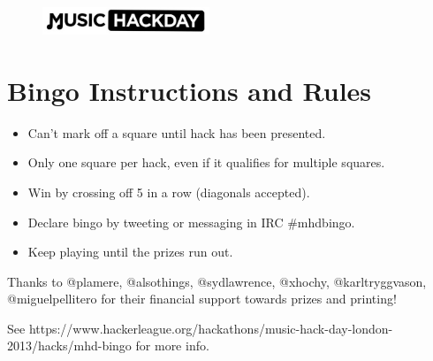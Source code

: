 \documentclass[a4]{article}
\def\Sequence{1, 2, 3, 4, 5}%
\newcommand{\Size}{3cm}
\begin{document}



\begin{figure}[h]
    \centering
    \includegraphics[width=5cm]{./mhdlogo.jpg}
\end{figure}


\section*{Bingo Instructions and Rules}
\begin{itemize}
\setlength{\itemsep}{0pt}%
\item Can't mark off a square until hack has been presented.
\item Only one square per hack, even if it qualifies for multiple squares.
\item Win by crossing off 5 in a row (diagonals accepted).
\item Declare bingo by tweeting or messaging in IRC \#mhdbingo.
\item Keep playing until the prizes run out.
\end{itemize}

\vspace{0.25cm}

\begin{center}
\end{center}

\vspace{0.25cm}
\noindent
Thanks to @plamere, @alsothings, @sydlawrence, @xhochy, @karltryggvason, @miguelpellitero for their financial support towards prizes and printing!
\vspace{0.25cm}

\noindent
See https://www.hackerleague.org/hackathons/music-hack-day-london-2013/hacks/mhd-bingo for more info.
\end{document}
